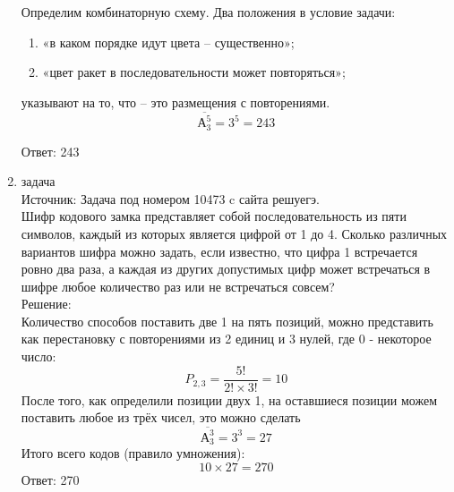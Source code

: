 \documentclass[a4paper,14pt]{extreport} %
\begin{document}
\begin{center}
\begin{enumerate}
						 Определим комбинаторную схему. Два положения в условие задачи:
						 \begin{enumerate}
						 \item«в каком порядке идут цвета – существенно»;
						 \item«цвет ракет в последовательности может повторяться»;
						 \end{enumerate}
						 указывают на то, что – это размещения с повторениями.
						 \begin{equation}
						 	\overline{А_{3}^5} = 3^5 = 243
						 \end{equation}
						 
						 Ответ: 243
						 
						 
						 \item {\large задача  }\\
						 Источник: Задача под номером 10473 c сайта решуегэ.\\
						 \vspace{15pt}
						Шифр кодового замка представляет собой последовательность из пяти символов, каждый из которых является цифрой от 1 до 4. Сколько различных вариантов шифра можно задать, если известно, что цифра 1 встречается ровно два раза, а каждая из других допустимых цифр может встречаться в шифре любое количество раз или не встречаться совсем?
						 \\
						 \vspace{15pt}
						 Решение:\\
						 Количество способов поставить две 1 на пять позиций, можно представить как перестановку с повторениями из 2 единиц и 3 нулей, где 0 - некоторое число:
						 \begin{equation}
						 	P_{2,3} = \frac{5!}{2! \times 3!} = 10
						 \end{equation}
						 После того, как определили позиции двух 1, на оставшиеся позиции можем поставить любое из трёх чисел, это можно сделать
						 \begin{equation}
						 	\overline{А_{3}^3} = 3^3 = 27
						 \end{equation}
						 Итого всего кодов (правило умножения):
						 \begin{equation}
						 	10 \times 27 = 270
						 \end{equation}
						 Ответ: 270
						 
						 
						 

\end{enumerate}
\end{center}
\end{document}
